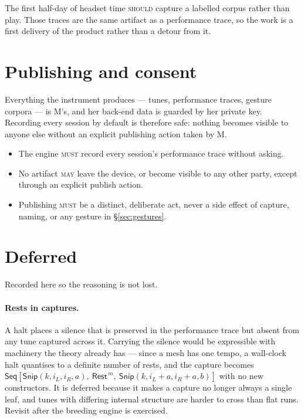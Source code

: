 \documentclass[11pt,a4paper]{article}
\newcommand{\MUST}{\textsc{must}}
\newcommand{\SHOULD}{\textsc{should}}
\newcommand{\MAY}{\textsc{may}}
\theoremstyle{definition}
\theoremstyle{plain}
\theoremstyle{remark}
\begin{document}
The first half-day of headset time \SHOULD{} capture a labelled corpus rather than play. Those
traces are the same artifact as a performance trace, so the work is a first delivery of the product
rather than a detour from it.

\section{Publishing and consent}

Everything the instrument produces --- tunes, performance traces, gesture corpora --- is M's, and
her back-end data is guarded by her private key. Recording every session by default is therefore
safe: nothing becomes visible to anyone else without an explicit publishing action taken by M.

\begin{itemize}[leftmargin=*]
\item The engine \MUST{} record every session's performance trace without asking.
\item No artifact \MAY{} leave the device, or become visible to any other party, except through an
      explicit publish action.
\item Publishing \MUST{} be a distinct, deliberate act, never a side effect of capture, naming, or
      any gesture in \S\ref{sec:gestures}.
\end{itemize}

\section{Deferred}
\label{sec:deferred}

Recorded here so the reasoning is not lost.

\paragraph{Rests in captures.} A halt places a silence that is preserved in the performance trace
but absent from any tune captured across it. Carrying the silence would be expressible with
machinery the theory already has --- since a mesh has one tempo, a wall-clock halt quantises to a
definite number of rests, and the capture becomes
$\mathsf{Seq}[\mathsf{Snip}(k,i_L,i_R,a),\ \mathsf{Rest}^{\,m},\ \mathsf{Snip}(k,i_L{+}a,i_R{+}a,b)]$
with no new constructors. It is deferred because it makes a capture no longer always a single leaf,
and tunes with differing internal structure are harder to cross than flat runs. Revisit after the
breeding engine is exercised.
\end{document}
